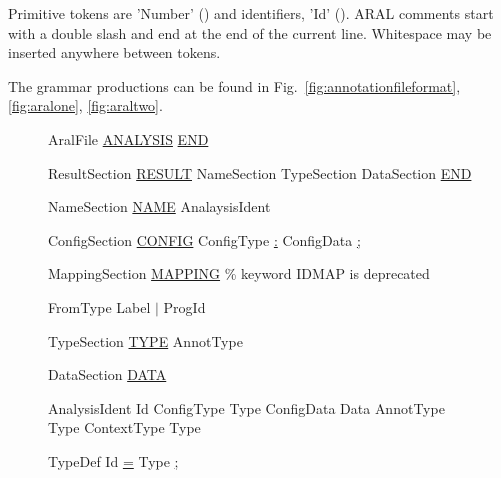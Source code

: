 \documentclass[a4paper,12pt]{report}
\begin{document}
{Primitive tokens are 'Number' () and identifiers, 'Id' ().
ARAL comments start with a double slash and end at the end of the current line. Whitespace may be inserted anywhere between tokens.

The grammar productions can be found in Fig.~\ref{fig:annotationfileformat},\ref{fig:aralone}, \ref{fig:araltwo}.

\begin{figure}[!ht]
\begin{GRAMMAR}
{AralFile}      \>\>\>\>\>\garrow\> \underline{ANALYSIS} 
                 \>\>\>\>\> \> 
                 \>\>\>\>\> \>  
                 \>\>\>\>\> \>  
                 \>\>\>\>\> \>       \underline{END}

{ResultSection}    \>\>\>\>\>\garrow\> \underline{RESULT}
                 \>\>\>\>\> \> NameSection
                 \>\>\>\>\> \> TypeSection 
                 \>\>\>\>\> \> DataSection 
                 \>\>\>\>\> \> \underline{END}

{NameSection}    \>\>\>\>\>\garrow\> \underline{NAME} AnalaysisIdent

{ConfigSection}  \>\>\>\>\>\garrow\> \underline{CONFIG} ConfigType \underline{:} ConfigData \underline{;}

{MappingSection}  \>\>\>\>\>\>\garrow\> \underline{MAPPING}  
                  \>\>\>\>\>\>\% keyword IDMAP is deprecated

{FromType}       \>\>\>\>\>\garrow\> Label
                 \>\>\>\>\> \> $\mid$ ProgId

{TypeSection}    \>\>\>\>\>\garrow\> \underline{TYPE}   AnnotType 

{DataSection}    \>\>\>\>\>\garrow\> \underline{DATA} 

{AnalysisIdent}  \>\>\>\>\>\garrow\> Id
{ConfigType}     \>\>\>\>\>\garrow\> Type
{ConfigData}     \>\>\>\>\>\garrow\> Data
{AnnotType}      \>\>\>\>\>\garrow\> Type
{ContextType}    \>\>\>\>\>\garrow\> Type

{TypeDef}        \>\>\>\>\>\garrow\> Id \underline{=} Type \underline{;}


\end{GRAMMAR}
\end{figure}}
\end{document}
